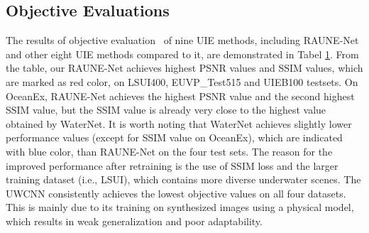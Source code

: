 \documentclass[runningheads]{llncs}
\begin{document}
\subsection{Objective Evaluations}
The results of objective evaluation~\cite{liu2018blind} of nine UIE methods, including RAUNE-Net and other eight UIE methods compared to it, are demonstrated in Tabel \hyperref[tab2]{1}. From the table, our RAUNE-Net achieves highest PSNR values and SSIM values, which are marked as red color, on LSUI400, EUVP\_Test515 and UIEB100 testsets. On OceanEx, RAUNE-Net achieves the highest PSNR value and the second highest SSIM value, but the SSIM value is already very close to the highest value obtained by WaterNet. It is worth noting that WaterNet achieves slightly lower performance values (except for SSIM value on OceanEx), which are indicated with blue color, than RAUNE-Net on the four test sets. The reason for the improved performance after retraining is the use of SSIM loss and the larger training dataset (i.e., LSUI), which contains more diverse underwater scenes. The UWCNN consistently achieves the lowest objective values on all four datasets. This is mainly due to its training on synthesized images using a physical model, which results in weak generalization and poor adaptability.
\end{document}
